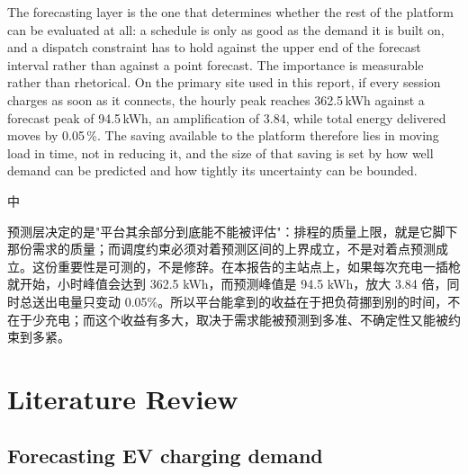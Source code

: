 \documentclass[10pt,a4paper]{article}
\newenvironment{zh}{%
  \par\vspace{1pt}%
  \begingroup
  \color{black!72}\small
  \setlength{\parskip}{0pt}%
  \noindent\textsf{\footnotesize 中}\hspace{3pt}\ignorespaces
}{%
  \par\endgroup\vspace{4pt}%
}
\begin{document}
The forecasting layer is the one that determines whether the rest of the platform can be evaluated
at all: a schedule is only as good as the demand it is built on, and a dispatch constraint has to
hold against the upper end of the forecast interval rather than against a point forecast. The
importance is measurable rather than rhetorical. On the primary site used in this report, if every
session charges as soon as it connects, the hourly peak reaches 362.5\,kWh against a forecast peak
of 94.5\,kWh, an amplification of 3.84, while total energy delivered moves by 0.05\,\%. The saving
available to the platform therefore lies in moving load in time, not in reducing it, and the size
of that saving is set by how well demand can be predicted and how tightly its uncertainty can be
bounded.

\begin{zh}
预测层决定的是"平台其余部分到底能不能被评估"：排程的质量上限，就是它脚下那份需求的质量；而调度约束必须对着预测区间的上界成立，不是对着点预测成立。这份重要性是可测的，不是修辞。在本报告的主站点上，如果每次充电一插枪就开始，小时峰值会达到 362.5 kWh，而预测峰值是 94.5 kWh，放大 3.84 倍，同时总送出电量只变动 0.05\%。所以平台能拿到的收益在于把负荷挪到别的时间，不在于少充电；而这个收益有多大，取决于需求能被预测到多准、不确定性又能被约束到多紧。
\end{zh}

\section{Literature Review}

\subsection{Forecasting EV charging demand}
\end{document}
